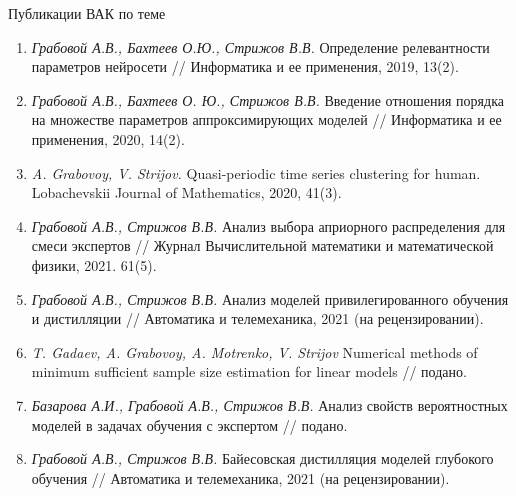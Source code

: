\documentclass[10pt,pdf,hyperref={unicode}]{beamer}
\begin{document}
\begin{frame}{Публикации ВАК по теме}
\justifying
\begin{enumerate}
\item \textit{Грабовой А.В., Бахтеев О.Ю., Стрижов В.В.} Определение релевантности параметров нейросети // Информатика и ее применения, 2019, 13(2).
\item \textit{Грабовой А.В., Бахтеев О. Ю., Стрижов В.В.} Введение отношения порядка на множестве параметров аппроксимирующих моделей // Информатика и ее применения, 2020, 14(2).
\item \textit{A. Grabovoy, V. Strijov.} Quasi-periodic time series clustering for human. Lobachevskii Journal of Mathematics, 2020, 41(3).
\item \textit{Грабовой А.В., Стрижов В.В.} Анализ выбора априорного распределения для смеси экспертов // Журнал Вычислительной математики и математической физики, 2021. 61(5).
\item \textit{Грабовой А.В., Стрижов В.В.} Анализ моделей привилегированного обучения и дистилляции // Автоматика и телемеханика, 2021 (на рецензировании).
\item \textit{T. Gadaev, A. Grabovoy, A. Motrenko, V. Strijov} Numerical methods of minimum sufficient sample size estimation for linear models // подано.
\item \textit{Базарова А.И., Грабовой А.В., Стрижов В.В.} Анализ свойств вероятностных моделей в задачах обучения с экспертом // подано.
\item \textit{Грабовой А.В., Стрижов В.В.} Байесовская дистилляция моделей глубокого обучения // Автоматика и телемеханика, 2021 (на рецензировании).
\end{enumerate}

\end{frame}
\end{document}
